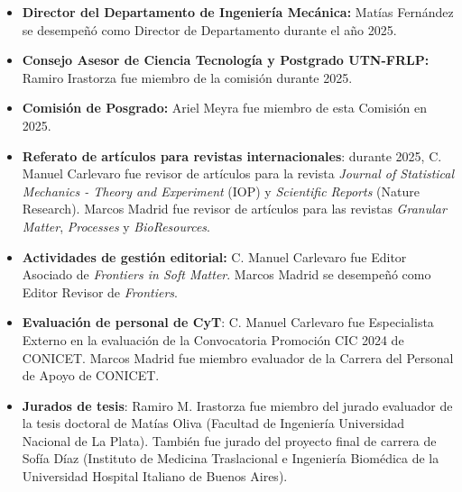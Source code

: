 \documentclass[a4paper,11pt,twoside,final,titlepage,onecolumn,openright]{report}
\begin{document}
\begin{itemize}
	\item \textbf{Director del Departamento de Ingeniería Mecánica:} Matías Fernández se desempeñó como Director de Departamento durante el año 2025.

	\item \textbf{Consejo Asesor de Ciencia Tecnología y Postgrado UTN-FRLP:} Ramiro Irastorza fue miembro de la comisión durante 2025.

	\item \textbf{Comisión de Posgrado:} Ariel Meyra fue miembro de esta Comisión en 2025.

  \item \textbf{Referato de artículos para revistas internacionales}: durante 2025, C. Manuel Carlevaro fue revisor de artículos para la revista \textit{Journal of Statistical Mechanics - Theory and Experiment} (IOP) y \textit{Scientific Reports} (Nature Research). Marcos Madrid fue revisor de artículos para las revistas \textit{Granular Matter}, \textit{Processes} y \textit{BioResources}.

  \item \textbf{Actividades de gestión editorial:} C. Manuel Carlevaro fue Editor Asociado de \textit{Frontiers in Soft Matter}. Marcos Madrid se desempeñó como Editor Revisor de \textit{Frontiers}.

	\item \textbf{Evaluación de personal de CyT}: C. Manuel Carlevaro fue Especialista Externo en la evaluación de la Convocatoria Promoción CIC 2024 de CONICET. Marcos Madrid fue miembro evaluador de la Carrera del Personal de Apoyo de CONICET.

	\item \textbf{Jurados de tesis}: Ramiro M. Irastorza fue miembro del jurado evaluador de la tesis doctoral de Matías Oliva (Facultad de Ingeniería Universidad Nacional de La Plata). También fue jurado del proyecto final de carrera de Sofía Díaz (Instituto de Medicina Traslacional e Ingeniería Biomédica de la Universidad Hospital Italiano de Buenos Aires).





\end{itemize}
\end{document}
